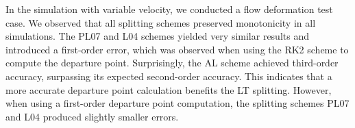 In the simulation with variable velocity, we conducted a flow deformation test case.
We observed that all splitting schemes preserved monotonicity in all simulations.
The PL07 and L04 schemes yielded very similar results and introduced a first-order error,
which was observed when using the RK2 scheme to compute the departure point.
Surprisingly, the AL scheme achieved third-order accuracy, surpassing its expected second-order accuracy.
This indicates that a more accurate departure point calculation benefits the LT splitting.
However, when using a first-order departure point computation, the splitting schemes PL07 and L04 produced slightly smaller errors.

